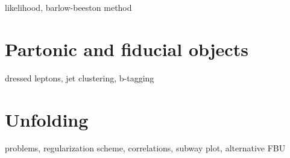 likelihood, barlow-beeston method

\section{Partonic and fiducial objects}

dressed leptons, jet clustering, b-tagging

\section{Unfolding}

problems, regularization scheme, correlations, subway plot, alternative FBU
